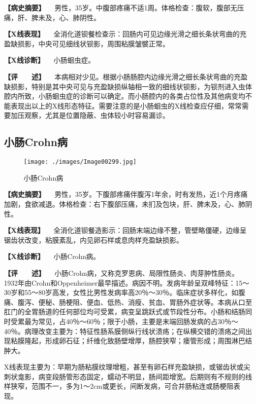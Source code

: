 \textbf{【病史摘要】}
　男性，35岁。中腹部疼痛不适1周。体格检查：腹软，腹部无压痛，肝、脾未及，心、肺阴性。

\textbf{【X线表现】}
　全消化道钡餐检查示：回肠内可见边缘光滑之细长条状弯曲的充盈缺损影，中央可见细线状钡影，周围粘膜皱襞正常。

\textbf{【X线诊断】} 　小肠蛔虫症。

\textbf{【评　　述】}
　本病相对少见。根据小肠肠腔内边缘光滑之细长条状弯曲的充盈缺损影，特别是其中央可见与充盈缺损纵轴相一致的细线状钡影，为钡剂进入虫体腔内所致，小肠蛔虫症的诊断可以确定。而小肠腔内的各类占位性及其他病变均不能表现出以上的X线形态特征。需要注意的是小肠蛔虫的X线检查应仔细，常常需要加压观察，尤其是位置隐蔽、虫体较小时容易漏诊。

\subsection{小肠Crohn病}

\begin{figure}[!htbp]
 \centering
 \texttt{[image: ./images/Image00299.jpg]}
 \captionsetup{justification=centering}
 \caption{小肠Crohn病}
 \label{fig5-5-3}
  \end{figure} 

\textbf{【病史摘要】}
　男性，35岁。下腹部疼痛伴腹泻1年余，时有发热，近1个月疼痛加剧，食欲减退。体格检查：右下腹部压痛，未扪及包块，肝、脾未及，心、肺阴性。

\textbf{【X线表现】}
　全消化道钡餐造影示：回肠末端边缘不整，管壁略僵硬，边缘呈锯齿状改变，粘膜紊乱，内见卵石样或息肉样充盈缺损影。

\textbf{【X线诊断】} 　小肠Crohn病。

\textbf{【评　　述】}
　小肠Crohn病，又称克罗恩病、局限性肠炎、肉芽肿性肠炎。1932年由Crohn和Oppenheimer最早描述。病因不明。发病年龄呈双峰特征：15～30岁和55～80岁高发，女性比男性发病率高20％～30％。临床症状多样化，如腹痛、腹泻、便秘、肠梗阻、便血、低热、消瘦、贫血、胃肠外症状等。本病从口至肛门的全胃肠道的任何部位均可受累，病变呈跳跃式或节段性分布。小肠和结肠同时受累最为常见，占40％～60％；限于小肠，主要是末端回肠发病的占30％～40％。病理改变主要为：特征性肠系膜侧纵行线状溃疡；在纵横交错的溃疡之间出现粘膜隆起，形成卵石征；纤维化致肠壁增厚，肠腔狭窄；瘘管形成；周围淋巴结肿大。

X线表现主要为：早期为肠粘膜纹理增粗，甚至有卵石样充盈缺损，或锯齿状或尖刺状龛影，病变段肠管形态固定，蠕动不明显，肠间距增宽。后期则有不规则的线样狭窄，范围不一，多为1～2cm或更长，间断发病，可合并肠粘连或肠梗阻表现。

